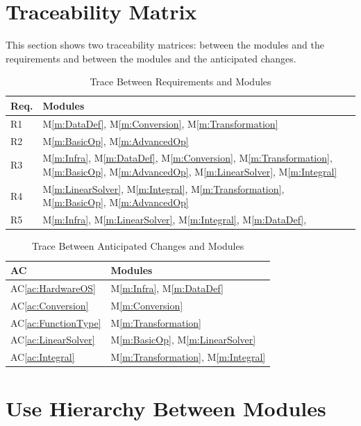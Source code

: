 \documentclass[12pt, titlepage]{article}
\newcommand{\acref}[1]{AC\ref{ac:#1}}
\newcommand{\mref}[1]{M\ref{m:#1}}
\begin{document}
\section{Traceability Matrix} \label{SecTM}

This section shows two traceability matrices: between the modules and the
requirements and between the modules and the anticipated changes.

\begin{table}[H]
\centering
\begin{tabular}{p{} p{}}
\toprule
\textbf{Req.} & \textbf{Modules}\\
\midrule
R1 & \mref{DataDef}, \mref{Conversion}, \mref{Transformation}\\
R2 & \mref{BasicOp}, \mref{AdvancedOp}\\
R3 & \mref{Infra}, \mref{DataDef}, \mref{Conversion}, \mref{Transformation}, \mref{BasicOp}, \mref{AdvancedOp}, \mref{LinearSolver}, \mref{Integral}\\
R4 & \mref{LinearSolver}, \mref{Integral}, \mref{Transformation}, \mref{BasicOp}, \mref{AdvancedOp}\\
R5 & \mref{Infra},  \mref{LinearSolver}, \mref{Integral}, \mref{DataDef},\\
\bottomrule
\end{tabular}
\caption{Trace Between Requirements and Modules}
\label{TblRT}
\end{table}

\begin{table}[H]
\centering
\begin{tabular}{p{} p{}}
\toprule
\textbf{AC} & \textbf{Modules}\\
\midrule
\acref{HardwareOS} & \mref{Infra}, \mref{DataDef}\\ 
\acref{Conversion} & \mref{Conversion}\\ 
\acref{FunctionType}& \mref{Transformation}\\ 
\acref{LinearSolver} & \mref{BasicOp}, \mref{LinearSolver}\\ 
\acref{Integral} & \mref{Transformation}, \mref{Integral}\\ 
\bottomrule
\end{tabular}
\caption{Trace Between Anticipated Changes and Modules}
\label{TblACT}
\end{table}

\section{Use Hierarchy Between Modules} \label{SecUse}
\end{document}
